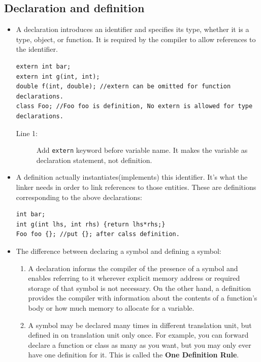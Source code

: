\documentclass[a4paper,11pt,twoside]{book}
\begin{document}
\subsection{Declaration and definition}
\begin{itemize}
	\item A declaration introduces an identifier and specifies its type, whether it is a type, object, or function. It is required by the compiler to allow references to the identifier.
	
\begin{lstlisting}
extern int bar;
extern int g(int, int); 
double f(int, double); //extern can be omitted for function declarations.
class Foo; //Foo foo is definition, No extern is allowed for type declarations.
\end{lstlisting}

\begin{description}
	\item[Line 1:] Add \texttt{extern} keyword before variable name. It makes the variable as declaration statement, not definition.
\end{description}
	
	\item A definition actually instantiates(implements) this identifier. It's what the linker needs in order to link references to those entities. These are definitions corresponding to the above declarations:

\begin{lstlisting}[numbers=none]
int bar;
int g(int lhs, int rhs) {return lhs*rhs;}
Foo foo {}; //put {}; after calss definition.
\end{lstlisting}
	
	\item The difference between declaring a symbol and defining a symbol:
	\begin{enumerate}
		\item A declaration informs the compiler of the presence of a symbol and enables referring to it wherever explicit memory address or required storage of that symbol is not necessary. On the other hand, a definition provides the compiler with information about the contents of a function's body or how much memory to allocate for a variable.
		
		\item A symbol may be declared many times in different translation unit, but defined in on translation unit only once. For example, you can forward declare a function or class as many as  you want, but you may only ever have one definition for it. This is called the \textbf{One Definition Rule}.
	\end{enumerate}

\end{itemize}
\end{document}
